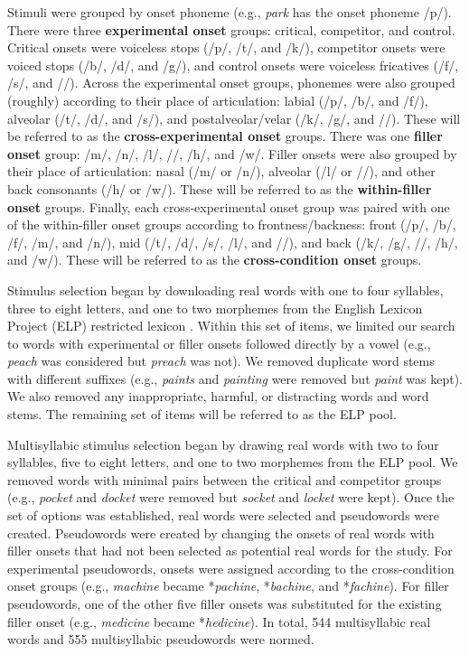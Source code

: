\documentclass[preprint, 3p, authoryear]{elsarticle} %
\begin{document}
Stimuli were grouped by onset phoneme (e.g., \emph{park} has the onset phoneme /p/).
There were three \textbf{experimental onset} groups: critical, competitor, and control.
Critical onsets were voiceless stops (/p/, /t/, and /k/), competitor onsets were voiced stops (/b/, /d/, and /g/), and control onsets were voiceless fricatives (/f/, /s/, and //).
Across the experimental onset groups, phonemes were also grouped (roughly) according to their place of articulation: labial (/p/, /b/, and /f/), alveolar (/t/, /d/, and /s/), and postalveolar/velar (/k/, /g/, and //).
These will be referred to as the \textbf{cross-experimental onset} groups.
There was one \textbf{filler onset} group: /m/, /n/, /l/, //, /h/, and /w/.
Filler onsets were also grouped by their place of articulation: nasal (/m/ or /n/), alveolar (/l/ or //), and other back consonants (/h/ or /w/).
These will be referred to as the \textbf{within-filler onset} groups.
Finally, each cross-experimental onset group was paired with one of the within-filler onset groups according to frontness/backness: front (/p/, /b/, /f/, /m/, and /n/), mid (/t/, /d/, /s/, /l/, and //), and back (/k/, /g/, //, /h/, and /w/).
These will be referred to as the \textbf{cross-condition onset} groups.

Stimulus selection began by downloading real words with one to four syllables, three to eight letters, and one to two morphemes from the English Lexicon Project (ELP) restricted lexicon \citep{balota2007}.
Within this set of items, we limited our search to words with experimental or filler onsets followed directly by a vowel (e.g., \emph{peach} was considered but \emph{preach} was not).
We removed duplicate word stems with different suffixes (e.g., \emph{paints} and \emph{painting} were removed but \emph{paint} was kept).
We also removed any inappropriate, harmful, or distracting words and word stems.
The remaining set of items will be referred to as the ELP pool.

Multisyllabic stimulus selection began by drawing real words with two to four syllables, five to eight letters, and one to two morphemes from the ELP pool.
We removed words with minimal pairs between the critical and competitor groups (e.g., \emph{pocket} and \emph{docket} were removed but \emph{socket} and \emph{locket} were kept).
Once the set of options was established, real words were selected and pseudowords were created.
Pseudowords were created by changing the onsets of real words with filler onsets that had not been selected as potential real words for the study.
For experimental pseudowords, onsets were assigned according to the cross-condition onset groups (e.g., \emph{machine} became *\emph{pachine}, *\emph{bachine}, and *\emph{fachine}).
For filler pseudowords, one of the other five filler onsets was substituted for the existing filler onset (e.g., \emph{medicine} became *\emph{hedicine}).
In total, 544 multisyllabic real words and 555 multisyllabic pseudowords were normed.
\end{document}
